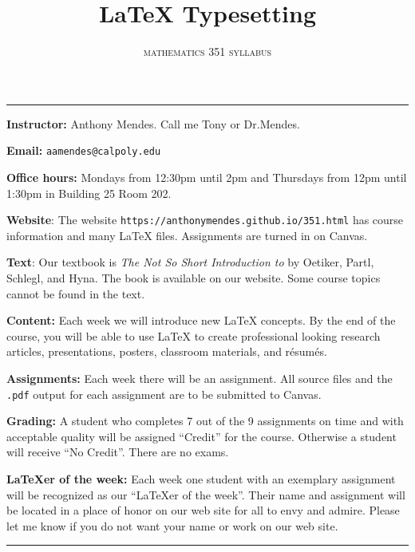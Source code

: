 \documentclass[10pt]{article}
\title{\LaTeX{} Typesetting}
\author{\textsc{mathematics 351 syllabus}}
\date{}
\begin{document}
\maketitle

\thispagestyle{empty}

\rule{\textwidth}{.01ex}

\textbf{Instructor:} Anthony Mendes.  Call me Tony or Dr.\@ Mendes.

\textbf{Email:} \texttt{aamendes@calpoly.edu}

\textbf{Office hours:} Mondays from 12:30pm until 2pm and Thursdays from 12pm
until 1:30pm in Building 25 Room 202.

\textbf{Website}: The website \texttt{https://anthonymendes.github.io/351.html}
has course information and many \LaTeX{} files.  Assignments are turned in on
Canvas.

\textbf{Text}: Our textbook is \textsl{The Not So Short Introduction to
  \LaTeXe} by Oetiker, Partl, Schlegl, and Hyna.  The book is available on our
website.  Some course topics cannot be found in the text.

\textbf{Content:} Each week we will introduce new \LaTeX{} concepts.  By the
end of the course, you will be able to use \LaTeX{} to create professional
looking research articles, presentations, posters, classroom materials, and
r\'esum\'es.

\textbf{Assignments:} Each week there will be an assignment.  All source files
and the \texttt{.pdf} output for each assignment are to be submitted to Canvas.

\textbf{Grading:} A student who completes 7 out of the 9 assignments on time
and with acceptable quality will be assigned ``Credit'' for the course.
Otherwise a student will receive ``No Credit''.  There are no exams.

\textbf{\LaTeX{er} of the week:} Each week one student with an exemplary
assignment will be recognized as our ``\LaTeX{er} of the week''.  Their name
and assignment will be located in a place of honor on our web site for all to
envy and admire.  Please let me know if you do not want your name or work on
our web site.

\rule{\textwidth}{.02ex}
\end{document}
